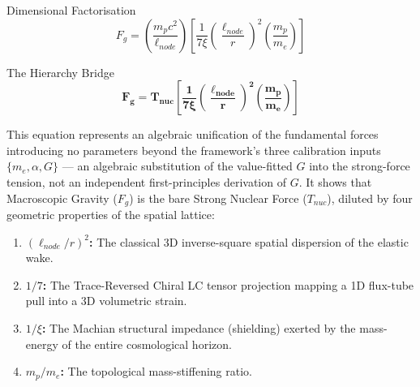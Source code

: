 \begin{resultbox}{Dimensional Factorisation}
\begin{equation}
F_g = \left( \frac{m_p c^2}{\ell_{node}} \right) \left[ \frac{1}{7 \xi} \left(\frac{\ell_{node}}{r}\right)^2 \left(\frac{m_p}{m_e}\right) \right]
\end{equation}
\end{resultbox}

\begin{resultbox}{The Hierarchy Bridge}
\begin{equation}
\mathbf{F_g = T_{nuc} \left[ \frac{1}{7 \xi} \left(\frac{\ell_{node}}{r}\right)^2 \left(\frac{m_p}{m_e}\right) \right]}
\end{equation}
\end{resultbox}

This equation represents an algebraic unification of the fundamental forces introducing no parameters beyond the framework's three calibration inputs $\{m_e, \alpha, G\}$ --- an algebraic substitution of the value-fitted $G$ into the strong-force tension, not an independent first-principles derivation of $G$. It shows that Macroscopic Gravity ($F_g$) is the bare Strong Nuclear Force ($T_{nuc}$), diluted by four geometric properties of the spatial lattice:
\begin{enumerate}
    \item \textbf{$(\ell_{node}/r)^2$:} The classical 3D inverse-square spatial dispersion of the elastic wake.
    \item \textbf{$1/7$:} The Trace-Reversed Chiral LC tensor projection mapping a 1D flux-tube pull into a 3D volumetric strain.
    \item \textbf{$1/\xi$:} The Machian structural impedance (shielding) exerted by the mass-energy of the entire cosmological horizon.
    \item \textbf{$m_p/m_e$:} The topological mass-stiffening ratio.
\end{enumerate}

